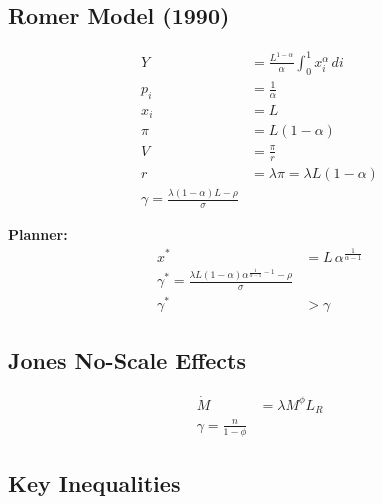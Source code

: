 \subsection{Romer Model (1990)}

\begin{align*}
Y &= \frac{L^{1-\alpha}}{\alpha} \int_0^1 x_i^\alpha \, di \tag{Final Good} \\
p_i &= \frac{1}{\alpha} \tag{Intermediate Price} \\
x_i &= L \tag{Intermediate Quantity} \\
\pi &= L(1-\alpha) \tag{Monopoly Profits} \\
V &= \frac{\pi}{r} \tag{Firm Value} \\
r &= \lambda \pi = \lambda L(1-\alpha) \tag{Free Entry} \\
\boxed{\gamma = \frac{\lambda(1-\alpha)L - \rho}{\sigma}} \tag{Market Growth}
\end{align*}

\medskip
\noindent\textbf{Planner:}
\begin{align*}
x^* &= L \,\alpha^{\frac{1}{\alpha-1}} \tag{Planner x*} \\
\boxed{\gamma^* = \frac{\lambda L(1-\alpha)\alpha^{\frac{1}{\alpha-1}-1} - \rho}{\sigma}} \tag{Planner Growth} \\
\gamma^* &> \gamma \tag{Monopoly Distortion}
\end{align*}

\subsection{Jones No-Scale Effects}

\begin{align*}
\dot{M} &= \lambda M^\phi L_R \tag{R\&D Technology} \\
\boxed{\gamma = \frac{n}{1-\phi}} \tag{Growth, $\phi < 1$}
\end{align*}

\subsection{Key Inequalities}

